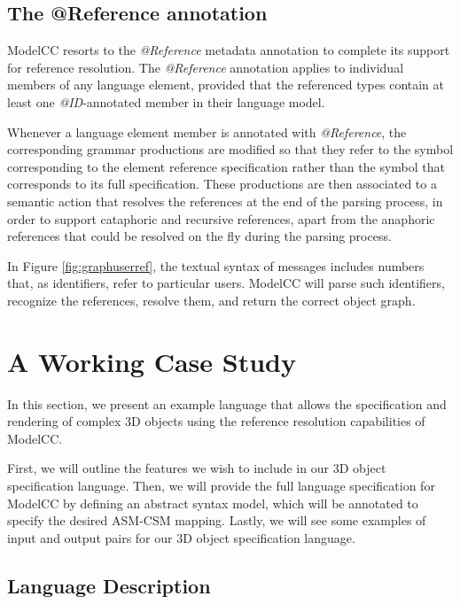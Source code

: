 \documentclass[floatfix,rmp,twocolumn,twoside]{revtex4}
\begin{document}
\subsection{The @Reference annotation} \label{sec:ref}

ModelCC resorts to the \emph{@Reference} metadata annotation to complete its support for reference resolution. The \emph{@Reference} annotation applies to individual members of any language element, provided that the referenced types contain at least one \emph{@ID}-annotated member in their language model.

Whenever a language element member is annotated with \emph{@Reference}, the corresponding grammar productions are modified so that they refer to the symbol corresponding to the element reference specification rather than the symbol that corresponds to its full specification. These productions are then associated to a semantic action that resolves the references at the end of the parsing process, in order to support cataphoric and recursive references, apart from the anaphoric references that could be resolved on the fly during the parsing process.

In Figure \ref{fig:graphuserref}, the textual syntax of messages includes numbers that, as identifiers, refer to particular users. ModelCC will parse such identifiers, recognize the references, resolve them, and return the correct object graph.

\section{A Working Case Study} \label{sec:exampleofagraphicallanguagemodel}

In this section, we present an example language that allows the specification and rendering of complex 3D objects using the reference resolution capabilities of ModelCC.

First, we will outline the features we wish to include in our 3D object specification language.
Then, we will provide the full language specification for ModelCC by defining an abstract syntax model, which will be annotated to specify the desired ASM-CSM mapping.
Lastly, we will see some examples of input and output pairs for our 3D object specification language.

\subsection{Language Description}
\end{document}
